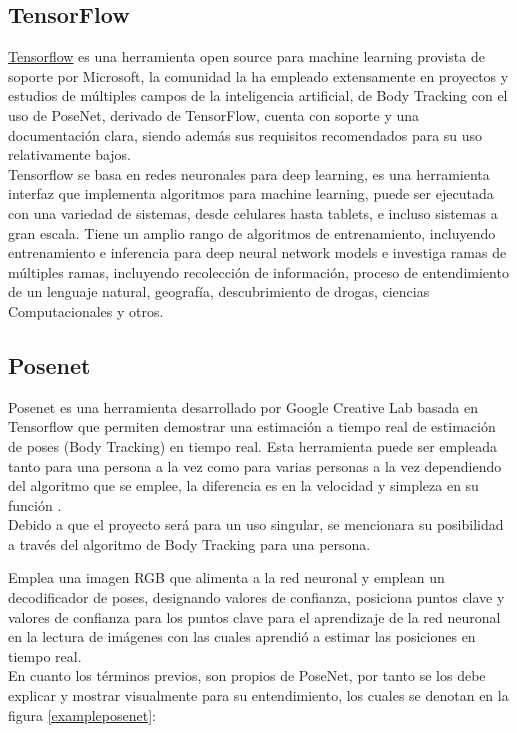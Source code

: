 \subsection{TensorFlow}

\href{https://www.tensorflow.org/lite/models/pose_estimation/overview}{Tensorflow}
es una herramienta open source para machine learning provista de soporte por Microsoft, la comunidad la ha empleado extensamente en proyectos y estudios de múltiples campos de la inteligencia artificial,  de Body Tracking con el uso de PoseNet, derivado de TensorFlow, cuenta con soporte y una documentación clara, siendo además sus requisitos recomendados para su uso relativamente bajos. 
\\
Tensorflow se basa en redes neuronales para deep learning, es una herramienta interfaz que implementa algoritmos para machine learning, puede ser ejecutada con una variedad de sistemas, desde celulares hasta tablets, e incluso sistemas a gran escala. Tiene un amplio rango de algoritmos de entrenamiento, incluyendo entrenamiento e inferencia para deep neural network models e investiga ramas de múltiples ramas, incluyendo recolección de información, proceso de entendimiento de un lenguaje natural, geografía, descubrimiento de drogas, ciencias Computacionales y otros.  \cite{abadi2016tensorflow}

\subsection{Posenet}

Posenet es una herramienta desarrollado por Google Creative Lab basada en Tensorflow que permiten demostrar una estimación a tiempo real de estimación de poses (Body Tracking) en tiempo real. Esta herramienta puede ser empleada tanto para una persona a la vez como para varias personas a la vez dependiendo del algoritmo que se emplee, la diferencia es en la velocidad y simpleza en su función \cite{kendall2015posenet}.
\\
Debido a que el proyecto será para un uso singular, se mencionara su posibilidad a través del algoritmo de Body Tracking para una persona.

Emplea una imagen RGB que alimenta a la red neuronal y emplean un decodificador de poses, designando valores de confianza, posiciona puntos clave y valores de confianza para los puntos clave para el aprendizaje de la red neuronal en la lectura de imágenes con las cuales aprendió a estimar las posiciones en tiempo real\cite{oved2018real}.
\\
En cuanto los términos previos, son propios de PoseNet, por tanto se los debe explicar y mostrar visualmente para su entendimiento, los cuales se denotan en la figura \ref{exampleposenet}:

